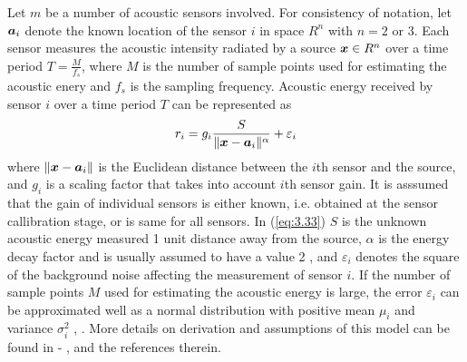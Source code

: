 Let $m$ be a number of acoustic sensors involved. For consistency of notation, let $\mbox{\boldmath$a$}_i$ denote the known location of the sensor $i$ in space $R^n$ with $n = 2$ or $3$. Each sensor measures the acoustic intensity radiated by a source $\mbox{\boldmath$x$}\in R^n$ over a time period $T = \frac{M}{f_s}$, where $M$ is the number of sample points used for estimating the acoustic enery and $f_s$ is the sampling frequency. %
 Acoustic energy received by sensor $i$ over a time period $T$ can be represented as
\begin{equation} \label{eq:3.33}
r_i = g_i \frac{S}{\|\mbox{\boldmath$x$} - \mbox{\boldmath$a$}_i\|^\alpha} + \varepsilon_i
\end{equation}
where $\|\mbox{\boldmath$x$} - \mbox{\boldmath$a$}_i\|$ is the Euclidean distance between the $i$th sensor and the source, and $g_i$ is a scaling factor that takes into account $i$th sensor gain. It is asssumed that the gain of individual sensors is either known, i.e. obtained at the sensor callibration stage, or is same for all sensors. In (\ref{eq:3.33}) $S$ is the unknown acoustic energy measured 1 unit distance away from the source, $\alpha$ is the energy decay factor %
and is usually assumed to have a value 2 \cite{LiHu}, and $\varepsilon_i$ denotes the square of the background noise affecting the measurement of sensor $i$. If the number of sample points $M$ used for estimating the acoustic energy  is large, the error $\varepsilon_i$ can be approximated well as a normal distribution with positive mean $\mu_i$ and variance $\sigma_i^2$ %
\cite{LiHu}, \cite{ShengHu}. More details on derivation and assumptions of this model can be found in %
\cite{LiHu} - \cite{Saric}, \cite{LiuHuPan} and the references therein. %


